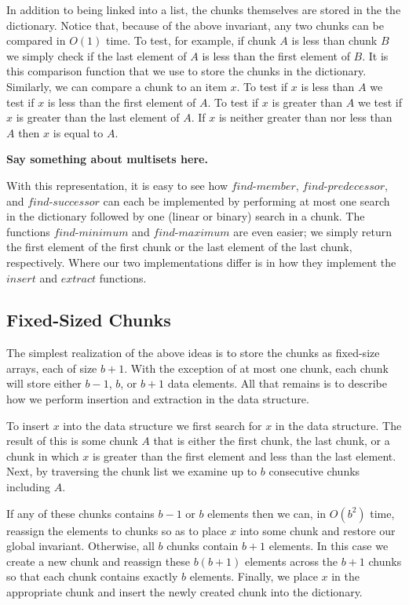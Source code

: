 \documentclass{DIKU-article}
\newcommand{\Findmin}{\mbox{$\mathit{find}$\textnormal{-}}\allowbreak{}\mbox{$\mathit{minimum}$}}
\newcommand{\Findmax}{\mbox{$\mathit{find}$\textnormal{-}}\allowbreak{}\mbox{$\mathit{maximum}$}}
\newcommand{\Member}{\mbox{$\mathit{find}$\textnormal{-}}\allowbreak{}\mbox{$\mathit{member}$}}
\newcommand{\Predecessor}{\mbox{$\mathit{find}$\textnormal{-}}\allowbreak{}\mbox{$\mathit{predecessor}$}}
\newcommand{\Successor}{\mbox{$\mathit{find}$\textnormal{-}}\allowbreak{}\mbox{$\mathit{successor}$}}
\newcommand{\Insert}{\mbox{$\mathit{insert}$}}
\newcommand{\Extract}{\mbox{$\mathit{extract}$}}
\begin{document}
In addition to being linked into a list, the chunks themselves are
stored in the the dictionary.  Notice that, because of the above
invariant, any two chunks can be compared in $O(1)$ time.  To test,
for example, if chunk $A$ is less than chunk $B$ we simply check if
the last element of $A$ is less than the first element of $B$.  It is
this comparison function that we use to store the chunks in the
dictionary.  Similarly, we can compare a chunk to an item $x$.  To
test if $x$ is less than $A$ we test if $x$ is less than the first
element of $A$.  To test if $x$ is greater than $A$ we test if $x$ is
greater than the last element of $A$.  If $x$ is neither greater than
nor less than $A$ then $x$ is equal to $A$.  

\noindent\textbf{Say something about multisets here.}

With this representation, it is easy to see how \Member{},
\Predecessor{}, and \Successor{} can each be implemented by performing
at most one search in the dictionary followed by one (linear or
binary) search in a chunk.  The functions \Findmin{} and \Findmax{}
are even easier;  we simply return the first element of the first
chunk or the last element of the last chunk, respectively.  Where our
two implementations differ is in how they implement the \Insert{} and
\Extract{} functions.

\subsection{Fixed-Sized Chunks}

The simplest realization of the above ideas is to store the chunks as
fixed-size arrays, each of size $b+1$.  With the exception of at most
one chunk, each chunk will store either $b-1$, $b$, or $b+1$ data
elements.  All that remains is to describe how we perform insertion
and extraction in the data structure.

To insert $x$ into the data structure we first search for $x$ in the
data structure.  The result of this is some chunk $A$ that is either
the first chunk, the last chunk, or a chunk in which $x$ is greater
than the first element and less than the last element.  Next, by
traversing the chunk list we examine up to $b$ consecutive chunks
including $A$.

If any of these chunks contains $b-1$ or $b$ elements then we can, in
$O(b^2)$ time, reassign the elements to chunks so as to place $x$ into
some chunk and restore our global invariant.  Otherwise, all $b$
chunks contain $b+1$ elements.  In this case we create a new chunk and
reassign these $b(b+1)$ elements across the $b+1$ chunks so that each
chunk contains exactly $b$ elements.  Finally, we place $x$ in the
appropriate chunk and insert the newly created chunk into the
dictionary.
\end{document}
